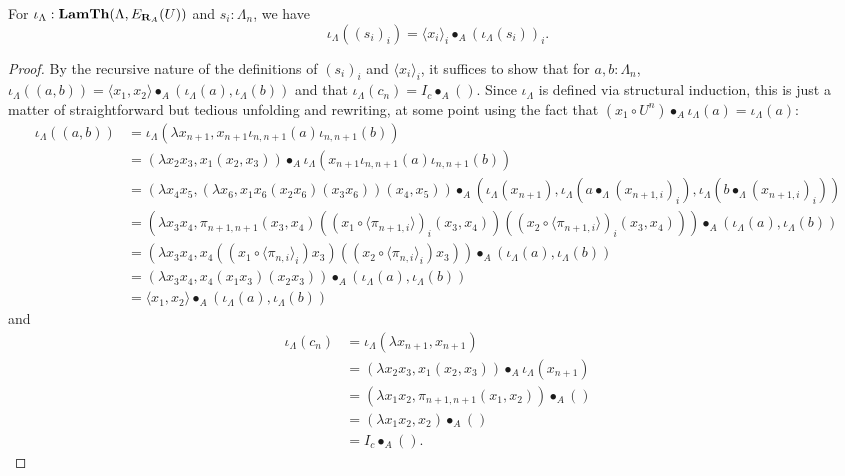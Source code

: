 \begin{lemma}
  For $ \iota_\Lambda: \mathbf{LamTh}(\Lambda, E_{\mathbf{R}_A}(U)) $ and $ s_i : \Lambda_n $, we have
  \[ \iota_\Lambda((s_i)_i) = \langle x_i \rangle_i \bullet_A (\iota_\Lambda(s_i))_i. \]
\end{lemma}
\begin{proof}
  By the recursive nature of the definitions of $ (s_i)_i $ and $ \langle x_i \rangle_i $, it suffices to show that for $ a, b : \Lambda_n $, $ \iota_\Lambda((a, b)) = \langle x_1, x_2 \rangle \bullet_A (\iota_\Lambda(a), \iota_\Lambda(b)) $ and that $ \iota_\Lambda(c_n) = I_c \bullet_A () $. Since $ \iota_\Lambda $ is defined via structural induction, this is just a matter of straightforward but tedious unfolding and rewriting, at some point using the fact that $ (x_1 \circ U^n) \bullet_A \iota_\Lambda(a) = \iota_\Lambda(a) $:
  \begin{align*}
    \iota_\Lambda((a, b))
    &= \iota_\Lambda(\lambda x_{n + 1}, x_{n + 1} \iota_{n, n + 1}(a) \iota_{n, n + 1}(b))\\
    &= (\lambda x_2 x_3, x_1 (x_2, x_3)) \bullet_A \iota_\Lambda(x_{n + 1} \iota_{n, n + 1}(a) \iota_{n, n + 1}(b))\\
    &= (\lambda x_4 x_5, (\lambda x_6, x_1 x_6 (x_2 x_6) (x_3 x_6)) (x_4, x_5)) \bullet_A (\iota_\Lambda(x_{n + 1}), \iota_\Lambda(a \bullet_\Lambda (x_{n + 1, i})_i), \iota_\Lambda(b \bullet_\Lambda (x_{n + 1, i})_i))\\
    &= (\lambda x_3 x_4, \pi_{n + 1, n + 1} (x_3, x_4) ((x_1 \circ \langle \pi_{n + 1, i} \rangle)_i (x_3, x_4)) ((x_2 \circ \langle \pi_{n + 1, i} \rangle)_i (x_3, x_4))) \bullet_A (\iota_\Lambda(a), \iota_\Lambda(b))\\
    &= (\lambda x_3 x_4, x_4 ((x_1 \circ \langle \pi_{n, i} \rangle_i) x_3) ((x_2 \circ \langle \pi_{n, i} \rangle_i) x_3)) \bullet_A (\iota_\Lambda(a), \iota_\Lambda(b))\\
    &= (\lambda x_3 x_4, x_4 (x_1 x_3) (x_2 x_3)) \bullet_A (\iota_\Lambda(a), \iota_\Lambda(b))\\
    &= \langle x_1, x_2 \rangle \bullet_A (\iota_\Lambda(a), \iota_\Lambda(b))
  \end{align*}
  and
  \begin{align*}
    \iota_\Lambda(c_n)
    &= \iota_\Lambda(\lambda x_{n + 1}, x_{n + 1})\\
    &= (\lambda x_2 x_3, x_1 (x_2, x_3)) \bullet_A \iota_\Lambda(x_{n + 1})\\
    &= (\lambda x_1 x_2, \pi_{n + 1, n + 1} (x_1, x_2)) \bullet_A ()\\
    &= (\lambda x_1 x_2, x_2) \bullet_A ()\\
    &= I_c \bullet_A ().
  \end{align*}
\end{proof}

